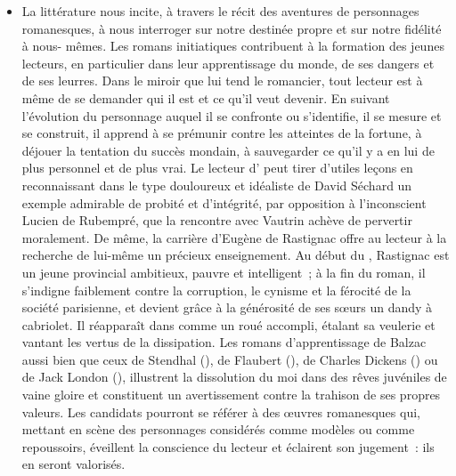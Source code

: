 {\begin{itemize}[label=\textbullet]
\item La littérature nous incite, à travers le récit des aventures de personnages
romanesques, à nous interroger sur notre destinée propre et sur notre fidélité à nous-
mêmes. Les romans initiatiques contribuent à la formation des jeunes lecteurs, en
particulier dans leur apprentissage du monde, de ses dangers et de ses leurres. Dans
le miroir que lui tend le romancier, tout lecteur est à même de se demander qui il est
et ce qu'il veut devenir. En suivant l'évolution du personnage auquel il se confronte ou
s'identifie, il se mesure et se construit, il apprend à se prémunir contre les atteintes de
la fortune, à déjouer la tentation du succès mondain, à sauvegarder ce qu'il y a en lui
de plus personnel et de plus vrai. Le lecteur d' peut tirer d'utiles leçons
en reconnaissant dans le type douloureux et idéaliste de David Séchard un exemple
admirable de probité et d'intégrité, par opposition à l'inconscient Lucien de Rubempré,
que la rencontre avec Vautrin achève de pervertir moralement. De même, la carrière
d'Eugène de Rastignac offre au lecteur à la recherche de lui-même un précieux
enseignement. Au début du , Rastignac est un jeune provincial ambitieux,
pauvre et intelligent~; à la fin du roman, il s'indigne faiblement contre la corruption, le
cynisme et la férocité de la société parisienne, et devient grâce à la générosité de ses
sœurs un dandy à cabriolet. Il réapparaît dans  comme un roué
accompli, étalant sa veulerie et vantant les vertus de la dissipation. Les romans
d'apprentissage de Balzac aussi bien que ceux de Stendhal (), de
Flaubert (), de Charles Dickens ()
ou de Jack London (), illustrent la dissolution du moi dans des rêves
juvéniles de vaine gloire et constituent un avertissement contre la trahison de ses
propres valeurs. Les candidats pourront se référer à des œuvres romanesques qui,
mettant en scène des personnages considérés comme modèles ou comme
repoussoirs, éveillent la conscience du lecteur et éclairent son jugement~: ils en seront
valorisés.


\end{itemize}}
